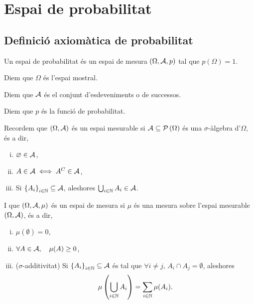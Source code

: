 \chapter{Espai de probabilitat}

\section{Definició axiomàtica de probabilitat}

\begin{defi}
    Un espai de probabilitat és un espai de mesura $(\Omega,\mathcal{A}, p)$ tal que $p(\Omega)=1$.
\end{defi}

\begin{defi}
    Diem que $\Omega$ és l'espai mostral.
\end{defi}

\begin{defi}
    Diem que $\mathcal{A}$ és el conjunt d'esdeveniments o de successos.
\end{defi}

\begin{defi}
    Diem que $p$ és la funció de probabilitat.
\end{defi}

\begin{obs}
    Recordem que $\left(\Omega,\mathcal{A}\right)$ és un espai mesurable si $\mathcal{A}\subseteq \mathcal{P}\left(\Omega\right)$ és una $\sigma$-àlgebra d'$\Omega$, és a dir,
    \begin{enumerate}[i)]
        \item $\varnothing \in \mathcal{A}$,
        \item $A \in \mathcal{A} \iff A^C \in \mathcal{A}$,
        \item Si $\left\{ A_i\right\} _{i\in\mathbb{N}}\subseteq \mathcal{A}$, aleshores $\bigcup_{i\in\mathbb{N}}{A_i} \in \mathcal{A}$.
    \end{enumerate}
    I que $\left(\Omega,\mathcal{A},\mu\right)$ és un espai de mesura si $\mu$ és una mesura sobre l'espai mesurable $\left(\Omega,\mathcal{A}\right)$, és a dir,
    \begin{enumerate}[i)]
        \item $\mu(\emptyset) = 0$,
        \item $\forall A \in \mathcal{A},\quad \mu(A) \ge0$,
        \item ($\sigma$-additivitat) Si $\left\{ A_i\right\}_{i\in\mathbb{N}}\subseteq\mathcal{A}$ és tal que $\forall i \neq j, \, A_i \cap A_j = \emptyset$,
        aleshores 
        \[
            \mu\left(\bigcup_{i\in\mathbb{N}}{A_i}\right) = \sum_{i\in\mathbb{N}}{\mu(A_i)}.
        \]
    \end{enumerate}
\end{obs}

